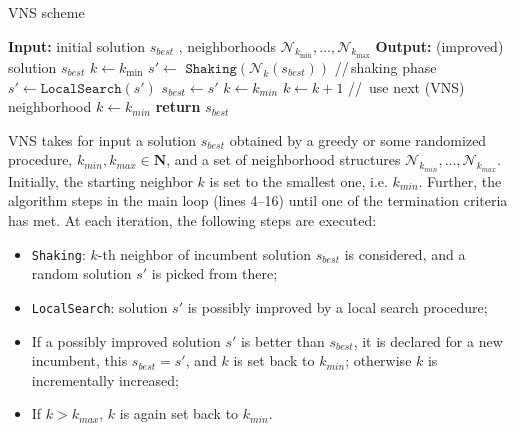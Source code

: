 \documentclass[sigconf]{acmart}
\begin{document}
     \begin{algorithm}[!t] 
  	\caption{VNS scheme}\label{alg:vns}
  	\begin{algorithmic}[1]
  		\STATE \textbf{Input:} initial solution $s_{best}$ , neighborhoods  $\mathcal{N}_{k_{\min}},\ldots, \mathcal{N}_{k_{\max}}$ 
  		\STATE \textbf{Output:} (improved) solution $s_{best}$
  		\STATE $k \gets  k_{\min}$
  		\STATE  $s' \gets$  $\texttt{Shaking}(\mathcal{N}_k(s_{best}))$ \hspace{0.3cm}//\,shaking phase
  		\STATE $s' \gets  \texttt{LocalSearch}(s {'})$
  		\STATE $s _{best}\gets s'$
  		\STATE $k \gets k_{min}$
  		\ELSE 
  		\STATE $k \gets k+1$ \hspace{0.3cm}//\, use next (VNS) neighborhood
  		\STATE $k\gets k_{min}$
  		\ENDIF
  		\ENDIF
  		\ENDWHILE
  		\STATE \textbf{return} $s_{best}$
  	\end{algorithmic}
  \end{algorithm}

 VNS takes for input a solution $s_{best}$ obtained by a greedy or some randomized procedure, $k_{min}, k_{max} \in \mathbf{N}$, 
  and a set of neighborhood structures $\mathcal{N}_{k_{min}}, \ldots, \mathcal{N}_{k_{max}}$.  
  Initially, the starting neighbor $k$ is set to the smallest one, i.e. $k_{min}$. Further, the algorithm steps in the main loop (lines 4--16) until one of the termination criteria has met. At each iteration, the following steps are executed: %
  
  \begin{itemize}
  	\item \texttt{Shaking}: $k$-th neighbor of incumbent solution $s_{best}$ is considered, and a random solution $s'$ is picked from there;
  	\item  \texttt{LocalSearch}: solution $s'$ is possibly improved by a local search procedure;
  	\item If a possibly improved solution $s'$ is better than $s_{best}$, it is declared for a new incumbent, this $s_{best} = s'$, and $k$ is set back to $k_{min}$; otherwise $k$ is incrementally increased;
  	\item  If $k> k_{max}$, $k$ is again set back to $k_{min}$.
   \end{itemize}
    
\end{document}
